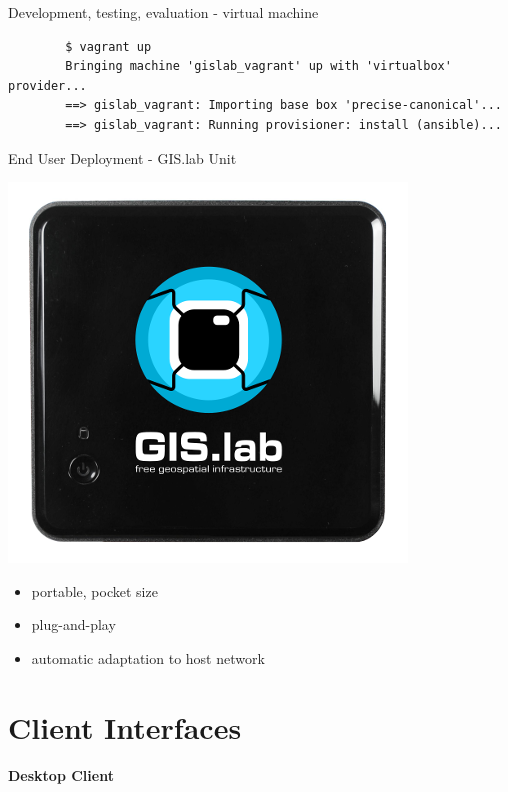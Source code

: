 \documentclass[12pt]{beamer}
\begin{document}
\begin{frame}[fragile]{Development, testing, evaluation - virtual machine}
   \lstset{language=sh}
	\begin{lstlisting}
		$ vagrant up
		Bringing machine 'gislab_vagrant' up with 'virtualbox' provider...
		==> gislab_vagrant: Importing base box 'precise-canonical'...
		==> gislab_vagrant: Running provisioner: install (ansible)...
	\end{lstlisting}
\end{frame}

\begin{frame}{End User Deployment - GIS.lab Unit}
	\begin{center}
		\includegraphics[keepaspectratio=true,height=0.6\textheight]{images/gislab-unit.png}
	\end{center}
	\begin{itemize}
		\item portable, pocket size
		\item plug-and-play
		\item automatic adaptation to host network
	\end{itemize}
\end{frame}


\section{Client Interfaces}
\begin{frame}
	\begin{center}
		\LARGE\textbf{Desktop Client}	
	\end{center}
\end{frame}
\end{document}
